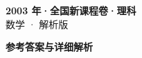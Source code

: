\documentclass[zihao=-4, a4paper]{ctexart}
\begin{document}
\begin{center}
  {\Large\bfseries 2003 年·全国新课程卷·理科}\\[4pt]
  {\large 数学 · 解析版}
\end{center}
\medskip
{}

\clearpage
{}
\begin{center}{\Large\bfseries 参考答案与详细解析}\end{center}
\medskip

\end{document}
